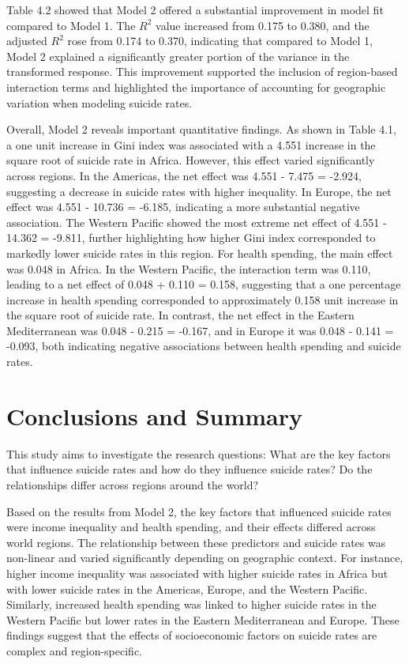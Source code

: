 \documentclass[
]{article}
\begin{document}
Table 4.2 showed that Model 2 offered a substantial improvement in model
fit compared to Model 1. The \(R^2\) value increased from 0.175 to
0.380, and the adjusted \(R^2\) rose from 0.174 to 0.370, indicating
that compared to Model 1, Model 2 explained a significantly greater
portion of the variance in the transformed response. This improvement
supported the inclusion of region-based interaction terms and
highlighted the importance of accounting for geographic variation when
modeling suicide rates.

Overall, Model 2 reveals important quantitative findings. As shown in
Table 4.1, a one unit increase in Gini index was associated with a 4.551
increase in the square root of suicide rate in Africa. However, this
effect varied significantly across regions. In the Americas, the net
effect was 4.551 - 7.475 = -2.924, suggesting a decrease in suicide
rates with higher inequality. In Europe, the net effect was 4.551 -
10.736 = -6.185, indicating a more substantial negative association. The
Western Pacific showed the most extreme net effect of 4.551 - 14.362 =
-9.811, further highlighting how higher Gini index corresponded to
markedly lower suicide rates in this region. For health spending, the
main effect was 0.048 in Africa. In the Western Pacific, the interaction
term was 0.110, leading to a net effect of 0.048 + 0.110 = 0.158,
suggesting that a one percentage increase in health spending
corresponded to approximately 0.158 unit increase in the square root of
suicide rate. In contrast, the net effect in the Eastern Mediterranean
was 0.048 - 0.215 = -0.167, and in Europe it was 0.048 - 0.141 = -0.093,
both indicating negative associations between health spending and
suicide rates.

\hfill\break
\hfill\break

\section{Conclusions and Summary}\label{conclusions-and-summary}

This study aims to investigate the research questions: What are the key
factors that influence suicide rates and how do they influence suicide
rates? Do the relationships differ across regions around the world?

Based on the results from Model 2, the key factors that influenced
suicide rates were income inequality and health spending, and their
effects differed across world regions. The relationship between these
predictors and suicide rates was non-linear and varied significantly
depending on geographic context. For instance, higher income inequality
was associated with higher suicide rates in Africa but with lower
suicide rates in the Americas, Europe, and the Western Pacific.
Similarly, increased health spending was linked to higher suicide rates
in the Western Pacific but lower rates in the Eastern Mediterranean and
Europe. These findings suggest that the effects of socioeconomic factors
on suicide rates are complex and region-specific.
\end{document}
